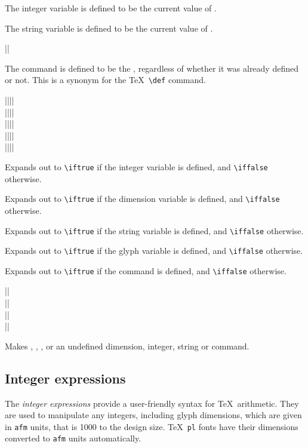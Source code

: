 \documentclass[a4paper]{ltxguide}
\newcommand*{\meta}{\m}
\newcommand*{\setfilename}[1]{\texttt{#1}}
\newcommand{\pl} {\setfilename{pl}\xspace}
\newcommand{\afm}{\setfilename{afm}\xspace}
\begin{document}
The integer variable  is defined to be the current value of
.

The string variable  is defined to be the current value of
.

\begin{decl}
  |\resetcommand|\meta{parameter text}
\end{decl}
The command  is defined to be the ,
regardless of whether it was already defined or not.  This is a
synonym for the \TeX\ \verb|\def| command.

\begin{decl}
  |\ifisint||\then|\\
  |\ifisdim||\then|\\
  |\ifisstr||\then|\\
  |\ifisglyph||\then|\\
  |\ifiscommand||\then|
\end{decl}
Expands out to \verb|\iftrue| if the integer variable
 is defined, and \verb|\iffalse| otherwise.

Expands out to \verb|\iftrue| if the dimension variable
 is defined, and \verb|\iffalse| otherwise.

Expands out to \verb|\iftrue| if the string variable
 is defined, and \verb|\iffalse| otherwise.

Expands out to \verb|\iftrue| if the glyph variable
 is defined, and \verb|\iffalse| otherwise.

Expands out to \verb|\iftrue| if the command
 is defined, and \verb|\iffalse| otherwise.

\begin{decl}
  |\unsetdim|\\
  |\unsetint|\\
  |\unsetstr|\\
  |\unsetcommand|
\end{decl}
Makes , , , or  an undefined
dimension, integer, string or command.

\subsection{Integer expressions}
\label{Sec:integer}

The \emph{integer expressions} provide a user-friendly syntax for
\TeX\ arithmetic.  They are used to manipulate any integers,
including glyph dimensions, which are given in \afm units, that is
1000 to the design size.  \TeX\ \pl fonts have their dimensions
converted to \afm units automatically.
\end{document}

